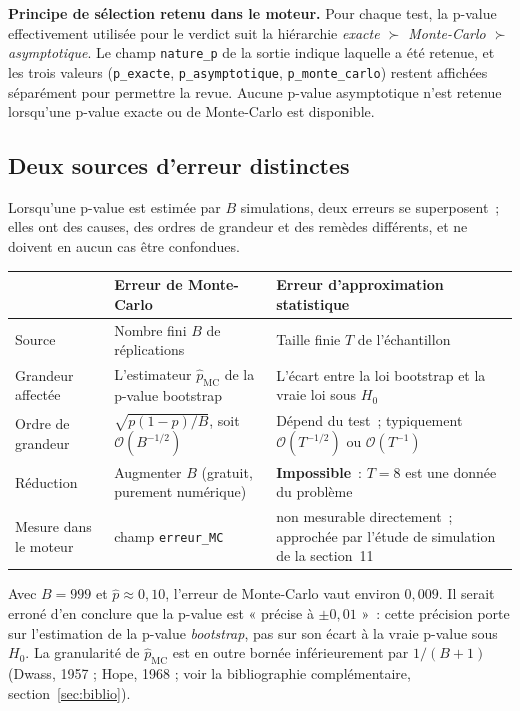 \documentclass[a4paper,11pt]{article}
\newcommand{\code}[1]{\texttt{\small #1}}
\begin{document}
\medskip
\begin{encadre}
\textbf{Principe de sélection retenu dans le moteur.} Pour chaque test, la
p-value effectivement utilisée pour le verdict suit la hiérarchie
\emph{exacte $\succ$ Monte-Carlo $\succ$ asymptotique}. Le champ \code{nature\_p}
de la sortie indique laquelle a été retenue, et les trois valeurs
(\code{p\_exacte}, \code{p\_asymptotique}, \code{p\_monte\_carlo}) restent
affichées séparément pour permettre la revue. Aucune p-value asymptotique n'est
retenue lorsqu'une p-value exacte ou de Monte-Carlo est disponible.
\end{encadre}

\subsection{Deux sources d'erreur distinctes}
\label{sec:deuxerreurs}

Lorsqu'une p-value est estimée par $B$ simulations, deux erreurs se
superposent~; elles ont des causes, des ordres de grandeur et des remèdes
différents, et ne doivent en aucun cas être confondues.

\begin{center}
\small
\begin{tabular}{@{}p{3.3cm}p{5.8cm}p{5.8cm}@{}}
\toprule
 & \textbf{Erreur de Monte-Carlo} & \textbf{Erreur d'approximation statistique} \\
\midrule
Source & Nombre fini $B$ de réplications & Taille finie $T$ de l'échantillon \\
Grandeur affectée & L'estimateur $\hat p_{\text{MC}}$ de la p-value bootstrap
& L'écart entre la loi bootstrap et la vraie loi sous $H_0$ \\
Ordre de grandeur & $\sqrt{p(1-p)/B}$, soit $\mathcal{O}(B^{-1/2})$ &
Dépend du test~; typiquement $\mathcal{O}(T^{-1/2})$ ou $\mathcal{O}(T^{-1})$ \\
Réduction & Augmenter $B$ (gratuit, purement numérique) &
\textbf{Impossible}~: $T = 8$ est une donnée du problème \\
Mesure dans le moteur & champ \code{erreur\_MC} & non mesurable directement~;
approchée par l'étude de simulation de la section~11 \\
\bottomrule
\end{tabular}
\end{center}

Avec $B = 999$ et $\hat p \approx 0{,}10$, l'erreur de Monte-Carlo vaut environ
$0{,}009$. Il serait erroné d'en conclure que la p-value est « précise à
$\pm 0{,}01$ »~: cette précision porte sur l'estimation de la p-value
\emph{bootstrap}, pas sur son écart à la vraie p-value sous $H_0$. La granularité
de $\hat p_{\text{MC}}$ est en outre bornée inférieurement par $1/(B+1)$
(Dwass, 1957 ; Hope, 1968 ; voir la bibliographie complémentaire, section~\ref{sec:biblio}).
\end{document}
